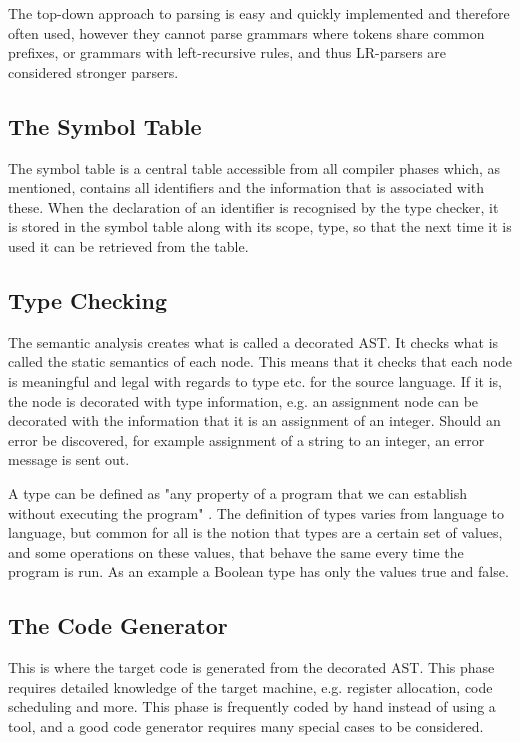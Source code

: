 The top-down approach to parsing is easy and quickly implemented and therefore often used, however they cannot parse grammars where tokens share common prefixes, or grammars with left-recursive rules, and thus LR-parsers are considered stronger parsers.

\subsection{The Symbol Table}

The symbol table is a central table accessible from all compiler phases which, as mentioned, contains all identifiers and the information that is associated with these. When the declaration of an identifier is recognised by the type checker, it is stored in the symbol table along with its scope, type, so that the next time it is used it can be retrieved from the table.

\subsection{Type Checking}
The semantic analysis creates what is called a decorated AST. It checks what is called the static semantics of each node. This means that it checks that each node is meaningful and legal with regards to type etc. for the source language. If it is, the node is decorated with type information, e.g. an assignment node can be decorated with the information that it is an assignment of an integer. Should an error be discovered, for example assignment of a string to an integer, an error message is sent out. 

A type can be defined as "any property of a program that we can establish without executing the program" \cite{Krishnamurthi2007}. The definition of types varies from language to language, but common for all is the notion that types are a certain set of values, and some operations on these values, that behave the same every time the program is run. As an example a Boolean type has only the values true and false. 

\subsection{The Code Generator}
This is where the target code is generated from the decorated AST. This phase requires detailed knowledge of the target machine, e.g. register allocation, code scheduling and more. This phase is frequently coded by hand instead of using a tool, and a good code generator requires many special cases to be considered.
